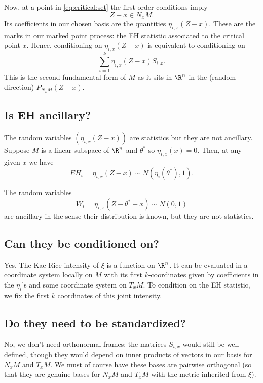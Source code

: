 \documentclass{article}
\begin{document}
Now, at a point in \eqref{eq:critical:set} the first order conditions imply
$$
Z-x \in N_xM.
$$
Its coefficients in our chosen basis are the quantities $\eta_{i,x}(Z-x)$. These are the marks
in our marked point process: the EH statistic associated to the critical point $x$. Hence, conditioning on $\eta_{i,x}(Z-x)$ is equivalent to conditioning on 
$$
\sum_{i=1}^k \eta_{i,x}(Z-x) S_{i,x}.
$$
This is the second fundamental form of $M$ as it sits in $\R^n$ in the (random direction) $P_{N_xM}(Z-x)$.

\subsection{Is EH ancillary?}

The random variables $(\eta_{i,x}(Z-x))$ are statistics but they are not ancillary.
Suppose $M$ is a linear subspace of $\R^n$ and $\theta^*$ so $\eta_{i,x}(x)=0$.
Then, at any given $x$ we have
$$
EH_i = \eta_{i,x}(Z-x) \sim N(\eta_i(\theta^*), 1).
$$

The random variables
$$
W_i = \eta_{i,x}(Z-\theta^*-x) \sim N(0, 1)
$$
are ancillary in the sense their distribution is known, but they are not statistics.

\subsection{Can they be conditioned on?}

Yes. The Kac-Rice intensity of $\xi$ is a function on $\R^n$. It can be evaluated in
a coordinate system locally on $M$ with its first $k$-coordinates given by coefficients
in the $\eta_i$'s and some coordinate system on $T_xM$. To condition on the
EH statistic, we fix the first $k$ coordinates of this joint intensity.

\subsection{Do they need to be standardized?}

No, we don't need orthonormal frames: the matrices $S_{i,x}$ would still be well-defined, though they would depend on inner products of vectors in our basis for $N_xM$ and $T_xM$. We must of course have these bases are pairwise orthogonal (so that they are genuine bases for $N_xM$ and $T_xM$ with the metric inherited from $\xi$).
\end{document}
